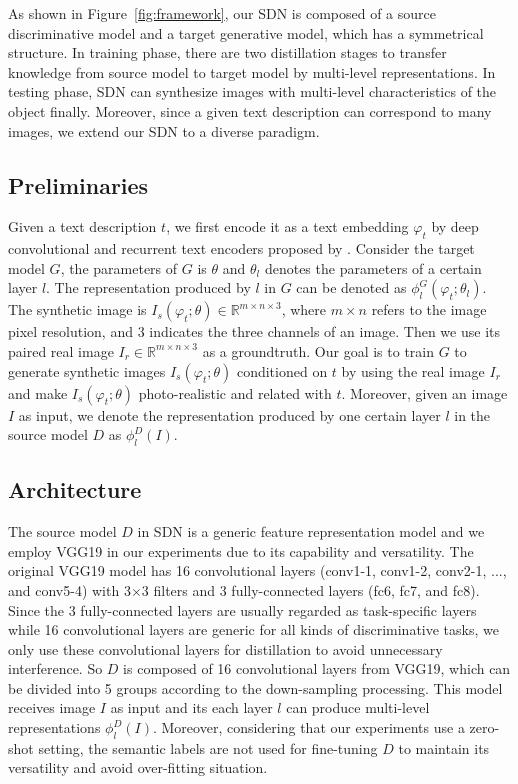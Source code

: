 \documentclass[sigconf]{acmart}
\begin{document}
As shown in Figure~\ref{fig:framework}, our SDN is composed of a source discriminative model and a target generative model, which has a symmetrical structure. In training phase, there are two distillation stages to transfer knowledge from source model to target model by multi-level representations. In testing phase, SDN can synthesize images with multi-level characteristics of the object finally. Moreover, since a given text description can correspond to many images, we extend our SDN to a diverse paradigm. 

\subsection{Preliminaries}
Given a text description $t$, we first encode it as a text embedding $\varphi_t$ by deep convolutional and recurrent text encoders proposed by \cite{reed2016learning}. Consider the target model $G$, the parameters of $G$ is $\theta$ and $\theta_l$ denotes the parameters of a certain layer $l$. The representation produced by $l$ in $G$ can be denoted as $\phi_l^G(\varphi_t;\theta_l)$. The synthetic image is $I_s(\varphi_t;\theta) \in \mathbb{R}^{m \times n \times 3}$, where $m \times n$ refers to the image pixel resolution, and $3$ indicates the three channels of an image. Then we use its paired real image $I_r \in \mathbb{R}^{m \times n \times 3}$ as a groundtruth. Our goal is to train $G$ to generate synthetic images $I_s(\varphi_t;\theta)$ conditioned on $t$ by using the real image $I_r$ and make $I_s(\varphi_t;\theta)$ photo-realistic and related with $t$. Moreover, given an image $I$ as input, we denote the representation produced by one certain layer $l$ in the source model $D$ as $\phi_l^D(I)$.

\subsection{Architecture}

The source model $D$ in SDN is a generic feature representation model and we employ VGG19 \cite{simonyan2014very} in our experiments due to its capability and versatility. The original VGG19 model has 16 convolutional layers (conv1-1, conv1-2, conv2-1, ..., and conv5-4) with 3$\times$3 filters and 3 fully-connected layers (fc6, fc7, and fc8). Since the 3 fully-connected layers are usually regarded as task-specific layers while 16 convolutional layers are generic for all kinds of discriminative tasks, we only use these convolutional layers for distillation to avoid unnecessary interference. So $D$ is composed of 16 convolutional layers from VGG19, which can be divided into 5 groups according to the down-sampling processing. This model receives image $I$ as input and its each layer $l$ can produce multi-level representations $\phi_l^D(I)$. Moreover, considering that our experiments use a zero-shot setting, the semantic labels are not used for fine-tuning $D$ to maintain its versatility and avoid over-fitting situation.
\end{document}
